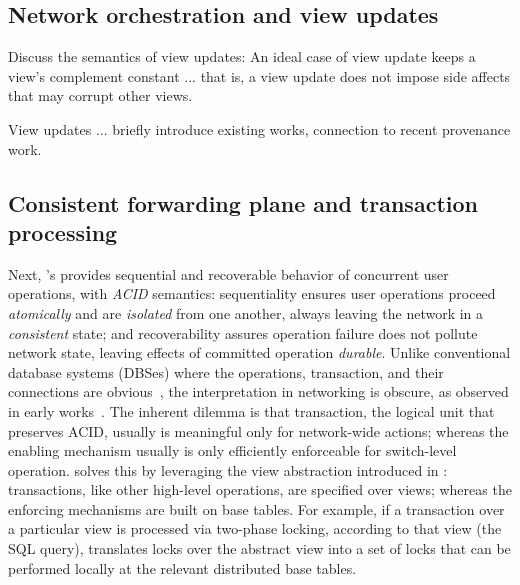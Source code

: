 \vspace{-.5em}
\label{sec:discussion}

\subsection{Network orchestration and view updates}

Discuss the semantics of view updates: An ideal case of view update
keeps a view's complement constant ... that is, a view update does not
impose side affects that may corrupt other views.

View updates ... briefly introduce existing works, connection to
recent provenance work.

\subsection{Consistent forwarding plane and transaction processing}


Next, \Sys's \TR provides sequential and recoverable behavior of
concurrent user operations, with \textit{ACID} semantics:
sequentiality ensures user operations proceed \textit{atomically} and
are \textit{isolated} from one another, always leaving the network in
a \textit{consistent} state; and recoverability assures operation
failure does not pollute network state, leaving effects of committed
operation \textit{durable}. Unlike conventional database systems
(DBSes) where the operations, transaction, and their connections are
obvious~\cite{Bernstein:concurrency-recovery,concurrency-recovery-alg,principles-tp,concurrency-ddb},
the interpretation in networking is obscure, as observed in early
works~\cite{hotsdn-transactional-networking,On-Consistent-Updates,of-cpp}.
The inherent dilemma is that transaction, the logical unit that
preserves ACID, usually is meaningful only for network-wide actions;
whereas the enabling mechanism usually is only efficiently enforceable
for switch-level operation. \TTR solves this by leveraging the view
abstraction introduced in \TI: transactions, like other high-level
operations, are specified over views; whereas the enforcing mechanisms
are built on base tables.  For example, if a transaction over a
particular view is processed via two-phase locking, according to that
view (the SQL query), \Sys translates locks over the abstract view
into a set of locks that can be performed locally at the relevant
distributed base tables.


